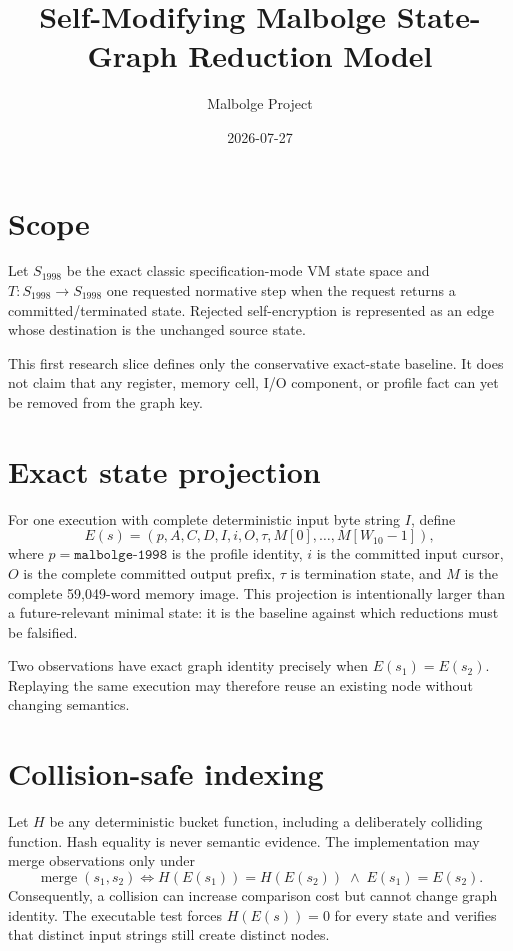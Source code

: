 \documentclass{article}
\title{Self-Modifying Malbolge State-Graph Reduction Model}
\author{Malbolge Project}
\date{2026-07-27}
\begin{document}
\maketitle

\section{Scope}

Let $S_{1998}$ be the exact classic specification-mode VM state space and
$T:S_{1998}\to S_{1998}$ one requested normative step when the request returns a
committed/terminated state. Rejected self-encryption is represented as an edge
whose destination is the unchanged source state.

This first research slice defines only the conservative exact-state baseline.
It does not claim that any register, memory cell, I/O component, or profile fact
can yet be removed from the graph key.

\section{Exact state projection}

For one execution with complete deterministic input byte string $I$, define
\begin{equation}
  E(s)=\left(
    p,A,C,D,I,i,O,\tau,M[0],\ldots,M[W_{10}-1]
  \right),
  \label{eq:state-graph-exact-key}
\end{equation}
where $p=\texttt{malbolge-1998}$ is the profile identity, $i$ is the committed
input cursor, $O$ is the complete committed output prefix, $\tau$ is termination
state, and $M$ is the complete 59,049-word memory image. This projection is
intentionally larger than a future-relevant minimal state: it is the baseline
against which reductions must be falsified.

Two observations have exact graph identity precisely when
$E(s_1)=E(s_2)$. Replaying the same execution may therefore reuse an existing
node without changing semantics.

\section{Collision-safe indexing}

Let $H$ be any deterministic bucket function, including a deliberately
colliding function. Hash equality is never semantic evidence. The implementation
may merge observations only under
\begin{equation}
  \operatorname{merge}(s_1,s_2)
    \Longleftrightarrow
    H(E(s_1))=H(E(s_2))\;\land\;E(s_1)=E(s_2).
  \label{eq:state-graph-collision-safe-merge}
\end{equation}
Consequently, a collision can increase comparison cost but cannot change graph
identity. The executable test forces $H(E(s))=0$ for every state and verifies
that distinct input strings still create distinct nodes.
\end{document}
